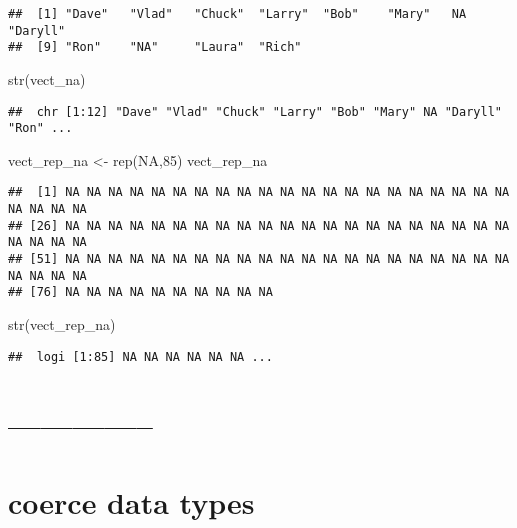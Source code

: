 \documentclass[
]{article}
\newenvironment{Shaded}{\begin{snugshade}}{\end{snugshade}}
\newcommand{\ConstantTok}[1]{\textcolor[rgb]{0.00,0.00,0.00}{#1}}
\newcommand{\DecValTok}[1]{\textcolor[rgb]{0.00,0.00,0.81}{#1}}
\newcommand{\FunctionTok}[1]{\textcolor[rgb]{0.00,0.00,0.00}{#1}}
\newcommand{\NormalTok}[1]{#1}
\newcommand{\OtherTok}[1]{\textcolor[rgb]{0.56,0.35,0.01}{#1}}
\begin{document}
\begin{verbatim}
##  [1] "Dave"   "Vlad"   "Chuck"  "Larry"  "Bob"    "Mary"   NA       "Daryll"
##  [9] "Ron"    "NA"     "Laura"  "Rich"
\end{verbatim}

\begin{Shaded}
\begin{Highlighting}[]
\FunctionTok{str}\NormalTok{(vect\_na)}
\end{Highlighting}
\end{Shaded}

\begin{verbatim}
##  chr [1:12] "Dave" "Vlad" "Chuck" "Larry" "Bob" "Mary" NA "Daryll" "Ron" ...
\end{verbatim}

\begin{Shaded}
\begin{Highlighting}[]
\NormalTok{vect\_rep\_na }\OtherTok{\textless{}{-}} \FunctionTok{rep}\NormalTok{(}\ConstantTok{NA}\NormalTok{,}\DecValTok{85}\NormalTok{)}
\NormalTok{vect\_rep\_na}
\end{Highlighting}
\end{Shaded}

\begin{verbatim}
##  [1] NA NA NA NA NA NA NA NA NA NA NA NA NA NA NA NA NA NA NA NA NA NA NA NA NA
## [26] NA NA NA NA NA NA NA NA NA NA NA NA NA NA NA NA NA NA NA NA NA NA NA NA NA
## [51] NA NA NA NA NA NA NA NA NA NA NA NA NA NA NA NA NA NA NA NA NA NA NA NA NA
## [76] NA NA NA NA NA NA NA NA NA NA
\end{verbatim}

\begin{Shaded}
\begin{Highlighting}[]
\FunctionTok{str}\NormalTok{(vect\_rep\_na)}
\end{Highlighting}
\end{Shaded}

\begin{verbatim}
##  logi [1:85] NA NA NA NA NA NA ...
\end{verbatim}

\hypertarget{section-24}{%
\section{--------------}\label{section-24}}

\hypertarget{coerce-data-types}{%
\section{coerce data types}\label{coerce-data-types}}
\end{document}
